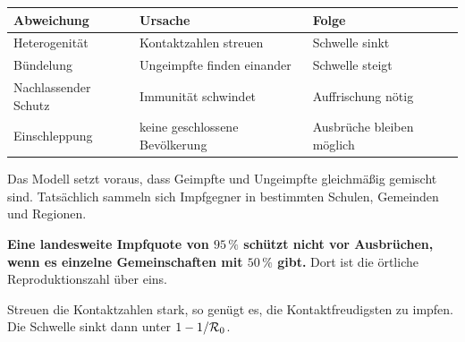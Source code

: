 \begin{warnung}
\begin{center}
{\small
\renewcommand{\arraystretch}{1.5}
\begin{tabular}{@{}P{2.4cm}P{2.8cm}P{2.8cm}@{}}
\toprule
\textbf{Abweichung} & \textbf{Ursache} & \textbf{Folge}\\
\midrule
Heterogenität & Kontaktzahlen streuen & \textcolor{gruen}{Schwelle sinkt}\\
Bündelung & Ungeimpfte finden einander & \textcolor{akzent}{Schwelle steigt}\\
Nachlassender Schutz & Immunität schwindet & \textcolor{akzent}{Auffrischung nötig}\\
Einschleppung & keine geschlossene Bevölkerung & Ausbrüche bleiben möglich\\
\bottomrule
\end{tabular}}
\end{center}

Das Modell setzt voraus, dass Geimpfte und Ungeimpfte gleichmäßig gemischt sind. Tatsächlich sammeln sich Impfgegner in bestimmten Schulen, Gemeinden und Regionen.

\begin{center}
\begin{minipage}{0.9\textwidth}
\textbf{Eine landesweite Impfquote von $95\,\%$ schützt nicht vor Ausbrüchen, wenn es einzelne Gemeinschaften mit $50\,\%$ gibt.} Dort ist die örtliche Reproduktionszahl über eins.
\end{minipage}
\end{center}

\begin{center}
\begin{minipage}{0.88\textwidth}
\end{minipage}
\end{center}

Streuen die Kontaktzahlen stark, so genügt es, die Kontaktfreudigsten zu impfen. Die Schwelle sinkt dann unter $1-1/\mathcal{R}_0$.

\begin{center}
\begin{minipage}{0.88\textwidth}
\end{minipage}
\end{center}
\end{warnung}

